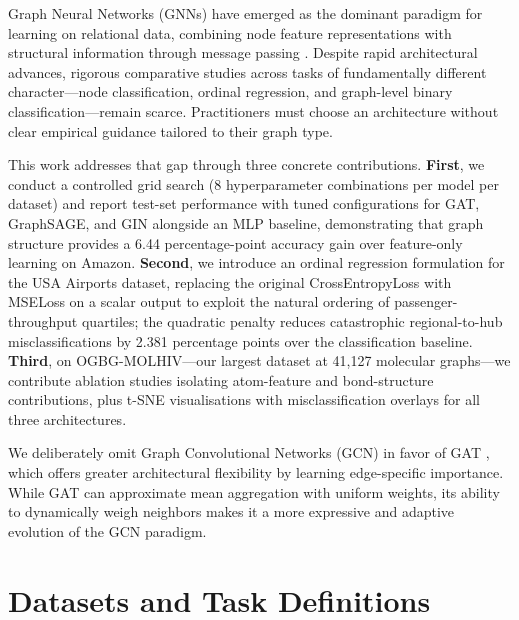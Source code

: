 \documentclass[conference]{IEEEtran}
\begin{document}
Graph Neural Networks (GNNs) have emerged as the dominant paradigm for learning on relational data, combining node feature representations with structural information through message passing \cite{gilmer2017}. Despite rapid architectural advances, rigorous comparative studies across tasks of fundamentally different character---node classification, ordinal regression, and graph-level binary classification---remain scarce. Practitioners must choose an architecture without clear empirical guidance tailored to their graph type.

This work addresses that gap through three concrete contributions. \textbf{First}, we conduct a controlled grid search (8 hyperparameter combinations per model per dataset) and report test-set performance with tuned configurations for GAT, GraphSAGE, and GIN alongside an MLP baseline, demonstrating that graph structure provides a 6.44 percentage-point accuracy gain over feature-only learning on Amazon. \textbf{Second}, we introduce an ordinal regression formulation for the USA Airports dataset, replacing the original CrossEntropyLoss with MSELoss on a scalar output to exploit the natural ordering of passenger-throughput quartiles; the quadratic penalty reduces catastrophic regional-to-hub misclassifications by 2.381 percentage points over the classification baseline. \textbf{Third}, on OGBG-MOLHIV---our largest dataset at 41,127 molecular graphs---we contribute ablation studies isolating atom-feature and bond-structure contributions, plus t-SNE visualisations with misclassification overlays for all three architectures.

We deliberately omit Graph Convolutional Networks (GCN) \cite{kipf2017} in favor of GAT \cite{velickovic2018}, which offers greater architectural flexibility by learning edge-specific importance. While GAT can approximate mean aggregation with uniform weights, its ability to dynamically weigh neighbors makes it a more expressive and adaptive evolution of the GCN paradigm.

\section{Datasets and Task Definitions}
\end{document}
